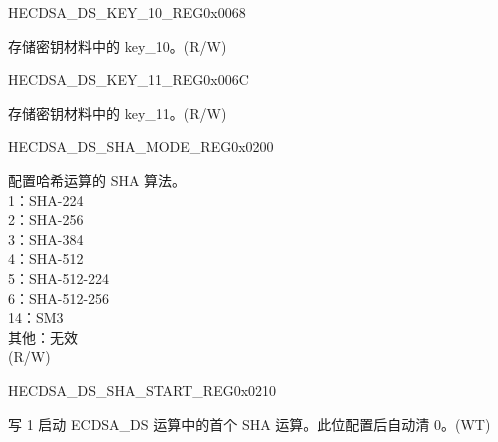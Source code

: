 \begin{register}{H}{ECDSA\_DS\_KEY\_10\_REG}{0x0068}\label{regdesc:ECDSADSKEY10REG}
%
\regnewline%
\begin{regdesc}\begin{reglist}
\label{fielddesc:ECDSADSKEY10}\item [ECDSA\_DS\_KEY\_10] 存储密钥材料中的 key\_10。(R/W)
\end{reglist}\end{regdesc}
\end{register}


\begin{register}{H}{ECDSA\_DS\_KEY\_11\_REG}{0x006C}\label{regdesc:ECDSADSKEY11REG}
%
\regnewline%
\begin{regdesc}\begin{reglist}
\label{fielddesc:ECDSADSKEY11}\item [ECDSA\_DS\_KEY\_11] 存储密钥材料中的 key\_11。(R/W)
\end{reglist}\end{regdesc}
\end{register}


\begin{register}{H}{ECDSA\_DS\_SHA\_MODE\_REG}{0x0200}\label{regdesc:ECDSADSSHAMODEREG}
%
%
\regnewline%
\begin{regdesc}\begin{reglist}
\label{fielddesc:ECDSADSSHAMODE}\item [ECDSA\_DS\_SHA\_MODE] 配置哈希运算的 SHA 算法。\\
1：SHA-224\\
2：SHA-256\\
3：SHA-384\\
4：SHA-512\\
5：SHA-512-224\\
6：SHA-512-256\\
14：SM3\\
其他：无效\\
(R/W)
\end{reglist}\end{regdesc}
\end{register}


\begin{register}{H}{ECDSA\_DS\_SHA\_START\_REG}{0x0210}\label{regdesc:ECDSADSSHASTARTREG}
%
%
\regnewline%
\begin{regdesc}\begin{reglist}
\label{fielddesc:ECDSADSSHASTART}\item [ECDSA\_DS\_SHA\_START] 写 1 启动 ECDSA\_DS 运算中的首个 SHA 运算。此位配置后自动清 0。(WT)
\end{reglist}\end{regdesc}
\end{register}


